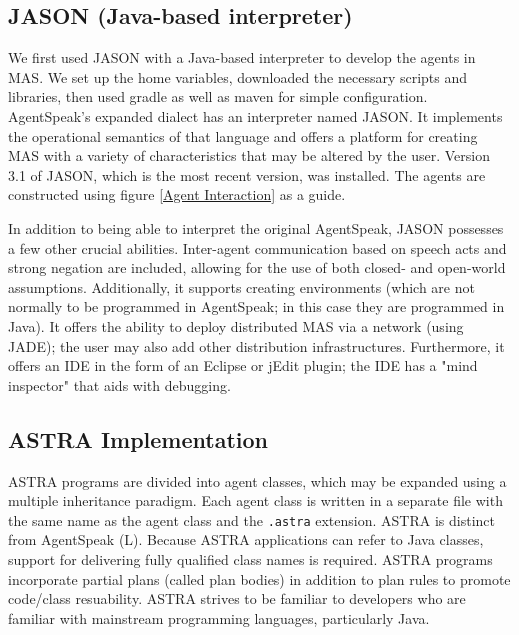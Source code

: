 \subsection{JASON (Java-based interpreter)}

We first used JASON with a Java-based interpreter to develop the agents in \ac{MAS}. We set up the home variables, downloaded the necessary scripts and libraries, then used gradle as well as maven for simple configuration. AgentSpeak's expanded dialect has an interpreter named JASON. It implements the operational semantics of that language and offers a platform for creating \ac{MAS} with a variety of characteristics that may be altered by the user. Version 3.1 of JASON, which is the most recent version, was installed. The agents are constructed using figure  \ref{Agent Interaction} as a guide.

\vspace{.5cm}

In addition to being able to interpret the original AgentSpeak, JASON possesses a few other crucial abilities. Inter-agent communication based on speech acts and strong negation are included, allowing for the use of both closed- and open-world assumptions. Additionally, it supports creating environments (which are not normally to be programmed in AgentSpeak; in this case they are programmed in Java). It offers the ability to deploy distributed \ac{MAS} via a network (using \ac{JADE}); the user may also add other distribution infrastructures. Furthermore, it offers an \ac{IDE} in the form of an Eclipse or jEdit plugin; the \ac{IDE} has a "mind inspector" that aids with debugging.

\subsection{ASTRA Implementation}

\ac{ASTRA} programs are divided into agent classes, which may be expanded using a multiple inheritance paradigm. Each agent class is written in a separate file with the same name as the agent class and the \texttt{.astra} extension. \ac{ASTRA} is distinct from AgentSpeak (L). Because \ac{ASTRA} applications can refer to Java classes, support for delivering fully qualified class names is required. \ac{ASTRA} programs incorporate partial plans (called plan bodies) in addition to plan rules to promote code/class resuability. \ac{ASTRA} strives to be familiar to developers who are familiar with mainstream programming languages, particularly Java.

